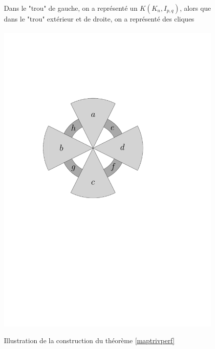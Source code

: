 \documentclass{scrartcl}
\begin{document}
\begin{flushleft}
\begin{figure}[h]
    \caption{Illustration de la construction du théorème \ref{maptrivperf}}
    \begin{center}
        Dans le "trou" de gauche, on a représenté un $K(K_n, I_{p,q})$, alors que dans le "trou" extérieur et de droite,
        on a représenté des cliques
        \\~\\
        \includegraphics[page=\ipeFigcartetrivperf, scale = 0.6]{figs}
    \end{center}
\end{figure}


\end{flushleft}
\end{document}
